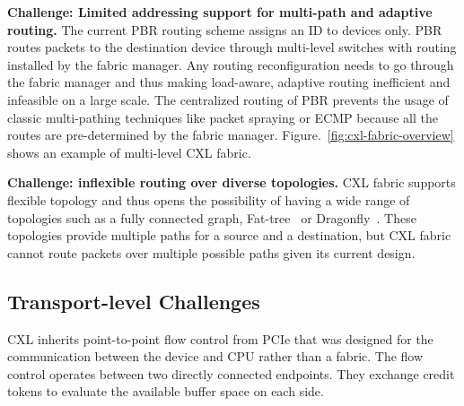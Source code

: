 \noindent \textbf{Challenge: Limited addressing support for multi-path and adaptive routing.}
%
%
The current PBR routing scheme assigns an ID to devices only. 
%
PBR routes packets to the destination device through multi-level switches with routing installed by the fabric manager. 
%
Any routing reconfiguration needs to go through the fabric manager and thus making load-aware, adaptive routing inefficient and infeasible on a large scale.
%
The centralized routing of PBR prevents the usage of classic multi-pathing techniques like packet spraying or ECMP because all the routes are pre-determined by the fabric manager.
%
Figure.~\ref{fig:cxl-fabric-overview} shows an example of multi-level CXL fabric.     
%
%
%

\noindent \textbf{Challenge: inflexible routing over diverse topologies.}
CXL fabric supports flexible topology and thus opens the possibility of having a wide range of topologies such as a fully connected graph, Fat-tree~\cite{fat-tree:sigcomm:2008} or Dragonfly~\cite{dragonfly:isca:2008}. 
%
These topologies provide multiple paths for a source and a destination, but CXL fabric cannot route packets over multiple possible paths given its current design.

\subsection{Transport-level Challenges}
\label{sec:motivation:transport}

CXL inherits point-to-point flow control from PCIe that was designed for the communication between the device and CPU rather than a fabric. 
%
The flow control operates between two directly connected endpoints. 
%
They exchange credit tokens to evaluate the available buffer space on each side. 
%

